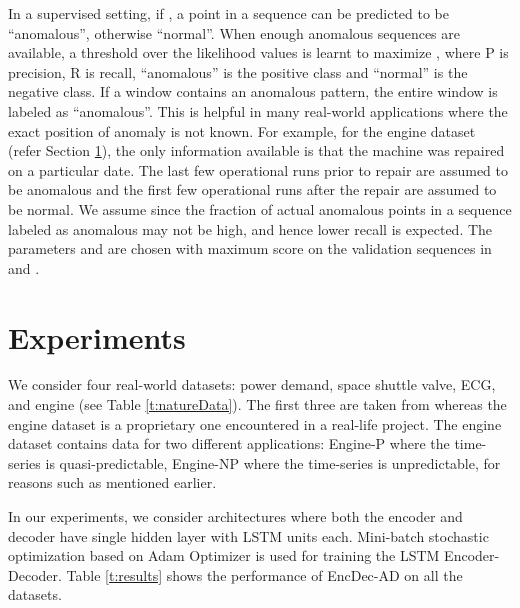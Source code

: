 \documentclass{article}
\begin{document}
In a supervised setting, if , a point in a sequence can be predicted to be ``anomalous'', otherwise ``normal''. When enough anomalous sequences are available, a threshold  over the likelihood values is learnt to maximize , where P is precision, R is recall, ``anomalous'' is the positive class and ``normal'' is the negative class.  If a window contains an anomalous pattern, the entire window is labeled as ``anomalous''. This is helpful in many real-world applications where the exact position of anomaly is not known. For example, for the engine dataset (refer Section \ref{sec:experiments}), the only information available is that the machine was repaired on a particular date. The last few operational runs prior to repair are assumed to be anomalous and the first few operational runs after the repair are assumed to be normal. We assume  since the fraction of actual anomalous points in a sequence labeled as anomalous may not be high, and hence lower recall is expected. The parameters  and  are chosen with maximum  score on the validation sequences in  and . 


\section{Experiments}\label{sec:experiments}
We consider four real-world datasets: power demand, space shuttle valve, ECG, and engine (see Table \ref{t:natureData}).
The first three are taken from \cite{p:keogh-hot-sax} whereas the engine dataset is a proprietary one encountered in a real-life project. The engine dataset contains data for two different applications: Engine-P where the time-series is quasi-predictable, Engine-NP where the time-series is unpredictable, for reasons such as mentioned earlier.

In our experiments, we consider architectures where both the encoder and decoder have single hidden layer with  LSTM units each. Mini-batch stochastic optimization based on Adam Optimizer \cite{p:adamOpt} is used for training the LSTM Encoder-Decoder. 
Table \ref{t:results} shows the performance of EncDec-AD on all the datasets. 

\begin{table}
\caption{Nature of datasets. ,  and  is no. of original sequences, normal subsequences and anomalous subsequences, respectively.\label{t:natureData}}
\vspace{-10pt}
\end{table}
\end{document}

